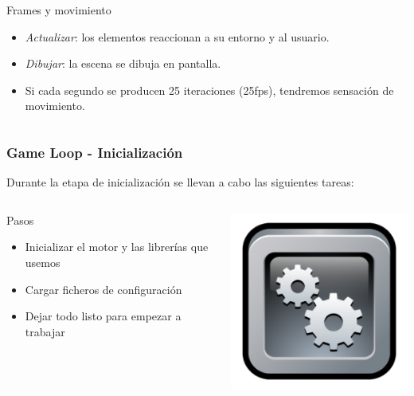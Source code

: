 \begin{frame}
\begin{columns}
	\column{150pt}
	\begin{alertblock}{Frames y movimiento}
		\begin{itemize}
			\item \emph{Actualizar}: los elementos reaccionan a su entorno y al usuario.
			\item \emph{Dibujar}: la escena se dibuja en pantalla.
			\item Si cada segundo se producen 25 iteraciones (25fps), tendremos sensación de movimiento.
		\end{itemize}            
	\end{alertblock}
	
	\end{columns}
\end{frame}

\begin{frame}
	\frametitle{Game Loop - Inicialización}
	
	Durante la etapa de inicialización se llevan a cabo las siguientes
	tareas:
	
	\begin{columns}[c]
	\column{200pt}
		
	\begin{block}{Pasos}
		\begin{itemize}
			\item Inicializar el motor y las librerías que usemos
			\item Cargar ficheros de configuración
			\item Dejar todo listo para empezar a trabajar
		\end{itemize}            
	\end{block}
	
	\column{100pt}
	
	\begin{center}
		\includegraphics[scale=0.25]{img/engine.png}
	\end{center}	
	
	\end{columns}
	
\end{frame}

